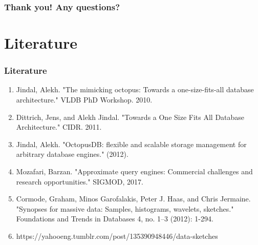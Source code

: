 \documentclass{beamer}
\begin{document}
\begin{frame}
 \frametitle{Thank you! Any questions?}
\end{frame}

\section{Literature}
\begin{frame}
\frametitle{Literature}
\begin{enumerate}
\item{Jindal, Alekh. "The mimicking octopus: Towards a one-size-fits-all database architecture." VLDB PhD Workshop. 2010.}
\item{Dittrich, Jens, and Alekh Jindal. "Towards a One Size Fits All Database Architecture." CIDR. 2011.}
\item{Jindal, Alekh. "OctopusDB: flexible and scalable storage management for arbitrary database engines." (2012).}
\item{Mozafari, Barzan. "Approximate query engines: Commercial challenges and research opportunities." SIGMOD, 2017.}
\item{Cormode, Graham, Minos Garofalakis, Peter J. Haas, and Chris Jermaine. "Synopses for massive data: Samples, histograms, wavelets, sketches." Foundations and Trends in Databases 4, no. 1–3 (2012): 1-294.}
\item{https://yahooeng.tumblr.com/post/135390948446/data-sketches}
\end{enumerate}
\end{frame}
\end{document}
